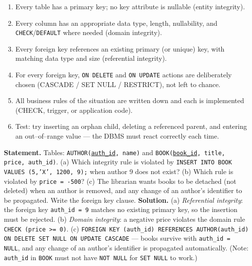 \documentclass[11pt]{article}
\begin{document}
\begin{methode}
\begin{enumerate}
\item Every table has a primary key; no key attribute is nullable (entity integrity).
\item Every column has an appropriate data type, length, nullability, and \texttt{CHECK}/\texttt{DEFAULT} where needed (domain integrity).
\item Every foreign key references an existing primary (or unique) key, with matching data type and size (referential integrity).
\item For every foreign key, \texttt{ON DELETE} and \texttt{ON UPDATE} actions are deliberately chosen (CASCADE / SET NULL / RESTRICT), not left to chance.
\item All business rules of the situation are written down and each is implemented (CHECK, trigger, or application code).
\item Test: try inserting an orphan child, deleting a referenced parent, and entering an out--of--range value — the DBMS must react correctly each time.
\end{enumerate}
\end{methode}

\begin{exoresolu}
\textbf{Statement.} Tables: \texttt{AUTHOR(\underline{auth\_id}, name)} and \texttt{BOOK(\underline{book\_id}, title, price, auth\_id)}. (a) Which integrity rule is violated by \texttt{INSERT INTO BOOK VALUES (5,'X', 1200, 9);} when author 9 does not exist? (b) Which rule is violated by \texttt{price = -500}? (c) The librarian wants books to be detached (not deleted) when an author is removed, and any change of an author's identifier to be propagated. Write the foreign key clause.
\tcblower
\textbf{Solution.} (a) \emph{Referential integrity}: the foreign key \texttt{auth\_id = 9} matches no existing primary key, so the insertion must be rejected. (b) \emph{Domain integrity}: a negative price violates the domain rule \texttt{CHECK (price >= 0)}. (c) \texttt{FOREIGN KEY (auth\_id) REFERENCES AUTHOR(auth\_id) ON DELETE SET NULL ON UPDATE CASCADE} — books survive with \texttt{auth\_id = NULL}, and any change of an author's identifier is propagated automatically. (Note: \texttt{auth\_id} in \texttt{BOOK} must not have \texttt{NOT NULL} for \texttt{SET NULL} to work.)
\end{exoresolu}
\end{document}
